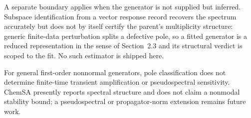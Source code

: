 A separate boundary applies when the generator is not supplied but inferred. Subspace identification from a vector response record recovers the spectrum accurately but does not by itself certify the parent's multiplicity structure: generic finite-data perturbation splits a defective pole, so a fitted generator is a reduced representation in the sense of Section~2.3 and its structural verdict is scoped to the fit. No such estimator is shipped here.

For general first-order nonnormal generators, pole classification does not determine finite-time transient amplification or pseudospectral sensitivity. ChemSA presently reports spectral structure and does not claim a nonmodal stability bound; a pseudospectral or propagator-norm extension remains future work.
